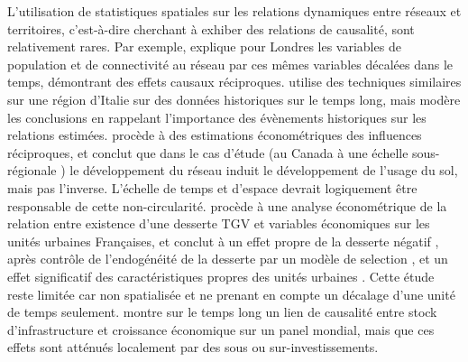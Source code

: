 {}{
L'utilisation de statistiques spatiales sur les relations dynamiques entre réseaux et territoires, c'est-à-dire cherchant à exhiber des relations de causalité, sont relativement rares. Par exemple, \cite{levinson2008density} explique pour Londres les variables  de population et de connectivité au réseau par ces mêmes variables décalées dans le temps, démontrant des effets causaux réciproques. \cite{doi:10.1068/b39089} utilise des techniques similaires sur une région d'Italie sur des données historiques sur le temps long, mais modère les conclusions en rappelant l'importance des évènements historiques sur les relations estimées. \cite{cuthbert2005empirical} procède à des estimations économétriques des influences réciproques, et conclut que dans le cas d'étude (au Canada à une échelle sous-régionale ) le développement du réseau induit le développement de l'usage du sol, mais pas l'inverse. L'échelle de temps et d'espace devrait logiquement être responsable de cette non-circularité. \cite{koning:hal-00962384} procède à une analyse économétrique de la relation entre existence d'une desserte TGV et variables économiques sur les unités urbaines Françaises, et conclut à un effet propre de la desserte négatif , après contrôle de l'endogénéité de la desserte par un modèle de selection , et un effet significatif des caractéristiques propres des unités urbaines . Cette étude reste limitée car non spatialisée et ne prenant en compte un décalage d'une unité de temps seulement. \cite{MANC:MANC1073} montre sur le temps long un lien de causalité entre stock d'infrastructure et croissance économique sur un panel mondial, mais que ces effets sont atténués localement par des sous ou sur-investissements.
}





